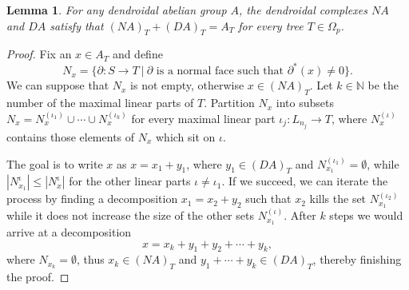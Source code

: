 \documentclass[a4paper]{amsart}
\newcommand{\N}{{\mathbb N}}
\theoremstyle{plain}
\newtheorem{lem}[thm]{Lemma}
\theoremstyle{definition}
\theoremstyle{remark}
\newcommand{\rpd}{\Omega_p}
\newcommand{\To}{\longrightarrow}
\numberwithin{equation}{section}
\numberwithin{figure}{section}
\begin{document}
\begin{lem}\label{direct sum 2}
    For any dendroidal abelian group $A$, the dendroidal complexes $NA$ and $DA$ satisfy that $(NA)_T+(DA)_T=A_T$ for every tree $T\in\rpd$.
\end{lem}
\begin{proof}
    Fix an $x\in A_T$ and define
    \[
        N_x=\big\{\partial\colon S\To T\ \big|\ \partial \mbox{ is a normal face such that } \partial^*(x)\neq 0\big\}.
    \]
    We can suppose that $N_x$ is not empty, otherwise $x\in (NA)_T$. Let $k\in \N$ be the number of the maximal linear parts of $T$. Partition $N_x$ into subsets $N_x=N_x^{(\iota_1)}\cup\cdots\cup N_x^{(\iota_k)}$ for every maximal linear part $\iota_j\colon L_{n_j}\To T$, where $N_x^{(\iota)}$ contains those elements of $N_x$ which sit on $\iota$.

    The goal is to write $x$ as $x=x_1+y_1$, where $y_1\in (DA)_T$ and $N_{x_1}^{(\iota_1)}=\emptyset$, while $|N_{x_1}^\iota|\leq |N_x^\iota|$ for the other linear parts $\iota\ne \iota_1$. If we succeed, we can iterate the process by finding a decomposition $x_1=x_2+y_2$ such that $x_2$ kills the set $N_{x_1}^{(\iota_2)}$ while it does not increase the size of the other sets $N_{x_1}^{(\iota)}$.
    After $k$ steps we would arrive at a decomposition
    \[
        x=x_k+y_1+y_2+\cdots+y_k,
    \]
    where $N_{x_k}=\emptyset$, thus $x_k\in (NA)_T$ and $y_1+\cdots+y_k\in (DA)_T$, thereby finishing the proof.


\end{proof}
\end{document}
